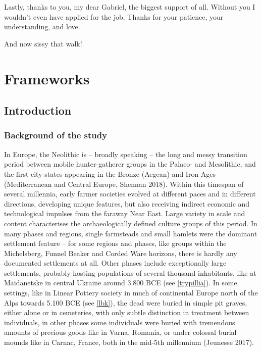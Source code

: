 \documentclass[
  12pt,
  a4paper, twoside]{book}
\begin{document}
Lastly, thanks to you, my dear Gabriel, the biggest support of all. Without you I wouldn't even have applied for the job. Thanks for your patience, your understanding, and love.

And now sissy that walk!

\tableofcontents

\listoffigures

\listoftables

\mainmatter

\pagestyle{fancy}

\hypertarget{part-frameworks}{%
\part{Frameworks}\label{part-frameworks}}

\hypertarget{intro}{%
\chapter{Introduction}\label{intro}}

\hypertarget{background-of-the-study}{%
\section{Background of the study}\label{background-of-the-study}}

In Europe, the Neolithic is -- broadly speaking -- the long and messy transition period between mobile hunter-gatherer groups in the Palaeo- and Mesolithic, and the first city states appearing in the Bronze (Aegean) and Iron Ages (Mediterranean and Central Europe, Shennan 2018). Within this timespan of several millennia, early farmer societies evolved at different paces and in different directions, developing unique features, but also receiving indirect economic and technological impulses from the faraway Near East. Large variety in scale and content characterises the archaeologically defined culture groups of this period. In many phases and regions, single farmsteads and small hamlets were the dominant settlement feature -- for some regions and phases, like groups within the Michelsberg, Funnel Beaker and Corded Ware horizons, there is hardly any documented settlements at all. Other phases include exceptionally large settlements, probably hosting populations of several thousand inhabitants, like at Maidanetske in central Ukraine around 3.800 BCE (see \ref{trypillia}). In some settings, like in Linear Pottery society in much of continental Europe north of the Alps towards 5.100 BCE (see \ref{lbk}), the dead were buried in simple pit graves, either alone or in cemeteries, with only subtle distinction in treatment between individuals, in other phases some individuals were buried with tremendous amounts of precious goods like in Varna, Romania, or under colossal burial mounds like in Carnac, France, both in the mid-5th millennium (Jeunesse 2017).
\end{document}
